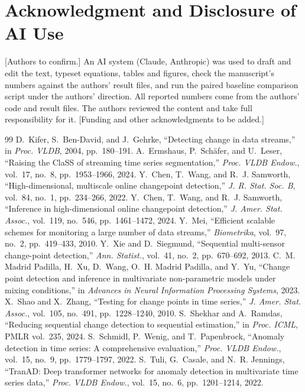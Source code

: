 \documentclass[conference]{IEEEtran}
\begin{document}
\section*{Acknowledgment and Disclosure of AI Use}
[Authors to confirm.] An AI system (Claude, Anthropic) was used to draft and edit the text, typeset equations, tables and figures, check the manuscript's numbers against the authors' result files, and run the paired baseline comparison script under the authors' direction. All reported numbers come from the authors' code and result files. The authors reviewed the content and take full responsibility for it. [Funding and other acknowledgments to be added.]

\begin{thebibliography}{99}
 D.~Kifer, S.~Ben-David, and J.~Gehrke, ``Detecting change in data streams,'' in \emph{Proc. VLDB}, 2004, pp.~180--191.
 A.~Ermshaus, P.~Sch\"afer, and U.~Leser, ``Raising the ClaSS of streaming time series segmentation,'' \emph{Proc. VLDB Endow.}, vol.~17, no.~8, pp.~1953--1966, 2024.
 Y.~Chen, T.~Wang, and R.~J. Samworth, ``High-dimensional, multiscale online changepoint detection,'' \emph{J. R. Stat. Soc. B}, vol.~84, no.~1, pp.~234--266, 2022.
 Y.~Chen, T.~Wang, and R.~J. Samworth, ``Inference in high-dimensional online changepoint detection,'' \emph{J. Amer. Stat. Assoc.}, vol.~119, no.~546, pp.~1461--1472, 2024.
 Y.~Mei, ``Efficient scalable schemes for monitoring a large number of data streams,'' \emph{Biometrika}, vol.~97, no.~2, pp.~419--433, 2010.
 Y.~Xie and D.~Siegmund, ``Sequential multi-sensor change-point detection,'' \emph{Ann. Statist.}, vol.~41, no.~2, pp.~670--692, 2013.
 C.~M. Madrid Padilla, H.~Xu, D.~Wang, O.~H. Madrid Padilla, and Y.~Yu, ``Change point detection and inference in multivariate non-parametric models under mixing conditions,'' in \emph{Advances in Neural Information Processing Systems}, 2023.
 X.~Shao and X.~Zhang, ``Testing for change points in time series,'' \emph{J. Amer. Stat. Assoc.}, vol.~105, no.~491, pp.~1228--1240, 2010.
 S.~Shekhar and A.~Ramdas, ``Reducing sequential change detection to sequential estimation,'' in \emph{Proc. ICML}, PMLR vol.~235, 2024.
 S.~Schmidl, P.~Wenig, and T.~Papenbrock, ``Anomaly detection in time series: A comprehensive evaluation,'' \emph{Proc. VLDB Endow.}, vol.~15, no.~9, pp.~1779--1797, 2022.
 S.~Tuli, G.~Casale, and N.~R. Jennings, ``TranAD: Deep transformer networks for anomaly detection in multivariate time series data,'' \emph{Proc. VLDB Endow.}, vol.~15, no.~6, pp.~1201--1214, 2022.

\end{thebibliography}
\end{document}
